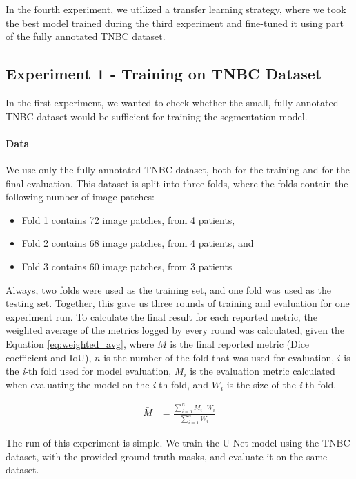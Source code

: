 In the fourth experiment, we utilized a transfer learning strategy, where we took the best model trained during the third experiment and fine-tuned it using part of the fully annotated TNBC dataset.

\subsection{Experiment 1 - Training on TNBC Dataset}
\label{sub:exp-1}
In the first experiment, we wanted to check whether the small, fully annotated TNBC dataset would be sufficient for training the segmentation model.

\paragraph{Data}
We use only the fully annotated TNBC dataset, both for the training and for the final evaluation. This dataset is split into three folds, where the folds contain the following number of image patches:

\begin{itemize}
    \item Fold 1 contains 72 image patches, from 4 patients,
    \item Fold 2 contains 68 image patches, from 4 patients, and
    \item Fold 3 contains 60 image patches, from 3 patients
\end{itemize}

Always, two folds were used as the training set, and one fold was used as the testing set. Together, this gave us three rounds of training and evaluation for one experiment run. To calculate the final result for each reported metric, the weighted average of the metrics logged by every round was calculated, given the Equation \ref{eq:weighted_avg}, where $\bar{M}$ is the final reported metric (Dice coefficient and IoU), $n$ is the number of the fold that was used for evaluation, $i$ is the \textit{i}-th fold used for model evaluation, $M_i$ is the evaluation metric calculated when evaluating the model on the \textit{i}-th fold, and $W_i$ is the size of the \textit{i}-th fold.

\begin{align}
\label{eq:weighted_avg}
\bar{M} &= \frac{\sum_{i=1}^{n} M_i \cdot W_i}{\sum_{i=1}^{n} W_i}
\end{align}

The run of this experiment is simple. We train the U-Net model using the TNBC dataset, with the provided ground truth masks, and evaluate it on the same dataset.

